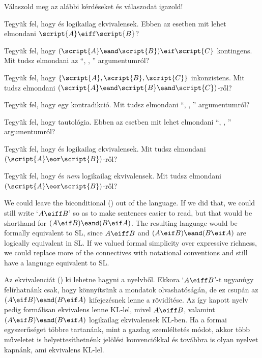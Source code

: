 \solutions
\problempart
\label{pr.TT.concepts}
Válaszold meg az alábbi kérdéseket és válaszodat igazold!
\begin{earg}
\item Tegyük fel, hogy  és  logikailag ekvivalensek. Ebben az esetben mit lehet elmondani $\script{A}\eiff\script{B}$?
\item Tegyük fel, hogy $(\script{A}\eand\script{B})\eif\script{C}$ kontingens. Mit tudsz elmondani az ``, , \therefore{}'' argumentumról?
\item Tegyük fel, hogy $\{\script{A},\script{B}, \script{C}\}$ inkonzistens. Mit tudsz elmondani $(\script{A}\eand\script{B}\eand\script{C})$-ről?
\item Tegyük fel, hogy  egy kontradikció. Mit tudsz elmondani ``, , \therefore{}'' argumentumról?
\item Tegyük fel, hogy  tautológia. Ebben az esetben mit lehet elmondani ``, , \therefore{}'' argumentumról?
\item Tegyük fel, hogy  és  logikailag ekvivalensek. Mit tudsz elmondani $(\script{A}\eor\script{B})$-ről?
\item Tegyük fel, hogy  és  \emph{nem} logikailag ekvivalensek. Mit tudsz elmondani $(\script{A}\eor\script{B})$-ről?
\end{earg}

\problempart
\label{pr.altConnectives}
We could leave the biconditional (\eiff) out of the language. If we did that, we could still write `$A\eiff B$' so as to make sentences easier to read, but that would be shorthand for $(A\eif B) \eand (B\eif A)$. The resulting language would be formally equivalent to SL, since $A\eiff B$ and $(A\eif B) \eand (B\eif A)$ are logically equivalent in SL. If we valued formal simplicity over expressive richness, we could replace more of the connectives with notational conventions and still have a language equivalent to SL. 

\problempart
\label{pr.altConnectives}
Az ekvivalenciát (\eiff) ki lehetne hagyni a nyelvből. Ekkora `$A\eiff B$'-t ugyanúgy felírhatnánk csak, hogy könnyítsünk a mondatok olvashatóságán, de ez csupán az $(A\eif B) \eand (B\eif A)$ kifejezésnek lenne a rövidítése. Az így kapott nyelv pedig formálisan ekvivalens lenne KL-lel, mivel $A\eiff B$, valamint $(A\eif B) \eand (B\eif A)$ logikailag ekvivalensek KL-ben. Ha a formai egyszerűséget többre tartanánk, mint a gazdag szemléltetés módot, akkor több műveletet is helyettesíthetnénk jelölési konvenciókkal és továbbra is olyan nyelvet kapnánk, ami ekvivalens KL-lel.

